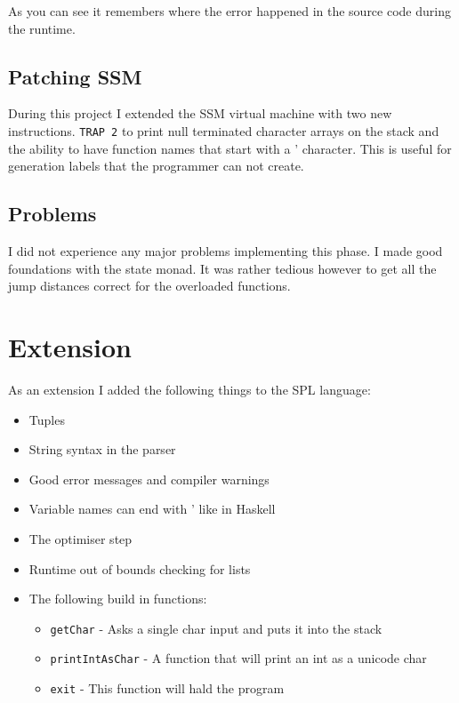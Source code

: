 \documentclass{report}
\begin{document}
\noindent As you can see it remembers where the error happened in the source code during the runtime.

\section{Patching SSM}

During this project I extended the SSM virtual machine with two new instructions. \texttt{TRAP 2} to print null terminated character arrays on the stack and the ability to have function names that start with a ' character. This is useful for generation labels that the programmer can not create.

\section{Problems}

I did not experience any major problems implementing this phase. I made good foundations with the state monad. It was rather tedious however to get all the jump distances correct for the overloaded functions.


\chapter{Extension}

As an extension I added the following things to the SPL language:

\begin{itemize}
    \item Tuples
    \item String syntax in the parser
    \item Good error messages and compiler warnings
    \item Variable names can end with ' like in Haskell
    \item The optimiser step
    \item Runtime out of bounds checking for lists
    \item The following build in functions:
    \begin{itemize}
        \item \texttt{getChar} - Asks a single char input and puts it into the stack
        \item \texttt{printIntAsChar} - A function that will print an int as a unicode char 
        \item \texttt{exit} - This function will hald the program
    \end{itemize}
\end{itemize}
\end{document}
